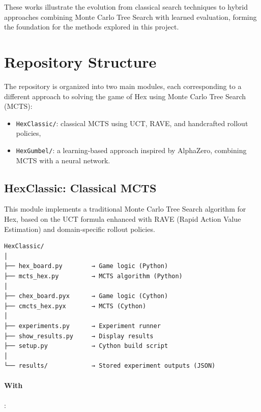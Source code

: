\documentclass[11pt,a4paper]{article}
\begin{document}
These works illustrate the evolution from classical search techniques to hybrid approaches combining Monte Carlo Tree Search with learned evaluation, forming the foundation for the methods explored in this project.

\section{Repository Structure}

The repository is organized into two main modules, each corresponding to a different approach to solving the game of Hex using Monte Carlo Tree Search (MCTS):

\begin{itemize}
    \item \texttt{HexClassic/}: classical MCTS using UCT, RAVE, and handcrafted rollout policies,
    \item \texttt{HexGumbel/}: a learning-based approach inspired by AlphaZero, combining MCTS with a neural network.
\end{itemize}

\subsection{HexClassic: Classical MCTS}

This module implements a traditional Monte Carlo Tree Search algorithm for Hex, based on the UCT formula enhanced with RAVE (Rapid Action Value Estimation) and domain-specific rollout policies.

\begin{verbatim}
HexClassic/
│
├── hex_board.py        → Game logic (Python)
├── mcts_hex.py         → MCTS algorithm (Python)
│
├── chex_board.pyx      → Game logic (Cython)
├── cmcts_hex.pyx       → MCTS (Cython)
│
├── experiments.py      → Experiment runner
├── show_results.py     → Display results
├── setup.py            → Cython build script
│
└── results/            → Stored experiment outputs (JSON)
\end{verbatim}

\paragraph{With} :
\end{document}

